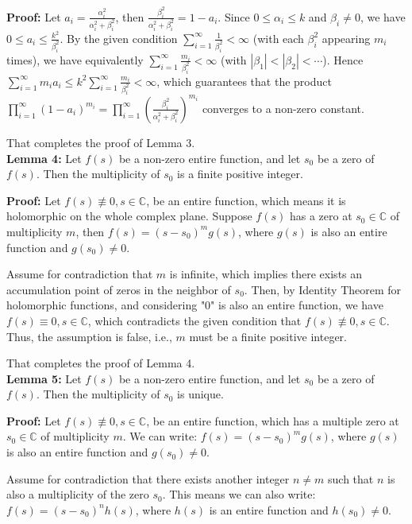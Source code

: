 \documentclass[12pt]{article}
\begin{document}
\textbf{Proof:} Let $a_i = \frac{\alpha_i^2}{\alpha_i^2+\beta_i^2}$, then
$\frac{\beta_i^2}{\alpha_i^2+\beta_i^2} = 1-a_i$.  Since \( 0 \leq \alpha_i \leq k \) and \( \beta_i \neq 0 \), we have $0 \leq a_i \leq \frac{k^2}{\beta_i^2}$.
By the given condition $\sum_{i=1}^{\infty}\frac{1}{\beta_i^2}<\infty$ (with each
$\beta_i^2$ appearing $m_i$ times), we have equivalently
$\sum_{i=1}^{\infty}\frac{m_i}{\beta_i^2}<\infty$ (with $|\beta_1|<|\beta_2|<\cdots$).
Hence $\sum_{i=1}^{\infty}m_i a_i \leq k^2\sum_{i=1}^{\infty}\frac{m_i}{\beta_i^2}< \infty$, which guarantees that the product
$\prod_{i=1}^{\infty}(1-a_i)^{m_i} = \prod_{i=1}^{\infty}\left(\frac{\beta_i^2}{\alpha_i^2+\beta_i^2}\right)^{m_i}$
converges to a non-zero constant.

That completes the proof of Lemma 3.\\

\textbf{Lemma 4:} Let $f(s)$ be a non-zero entire function, and let $s_0$ be a zero of $f(s)$. Then the multiplicity of $s_0$ is a finite positive integer.

\textbf{Proof:} Let $f(s) \not\equiv 0,  s \in \mathbb{C}$,  be an entire function, which means it is holomorphic  on the whole complex plane. Suppose $f(s)$ has a zero at $s_0 \in \mathbb{C}$ of multiplicity $m$, then $ f(s) = (s - s_0)^m g(s) $, where $g(s)$ is also an entire function and $g(s_0) \neq 0$.

Assume for contradiction that $m$ is infinite, which implies there exists an accumulation point of zeros in the neighbor of $s_0$.  Then, by Identity Theorem for holomorphic functions, and considering "0" is also an entire function, we have $f(s) \equiv 0, s \in \mathbb{C}$, which contradicts the given condition that $f(s)\not\equiv 0, s \in \mathbb{C}$.
Thus, the assumption is false, i.e., $m$ must be a finite positive integer.

That completes the proof of Lemma 4.\\


\textbf{Lemma 5:} Let $f(s)$ be a non-zero entire function, and let $s_0$ be a zero of $f(s)$. Then the multiplicity of $s_0$ is unique.

\textbf{Proof:} Let $f(s)\not\equiv 0, s\in \mathbb{C}$, be an entire function, which has a multiple zero at $s_0\in \mathbb{C}$ of multiplicity $m$.
We can write: $ f(s) = (s - s_0)^m g(s) $, where $ g(s) $ is also an entire function and $ g(s_0) \neq 0 $.

Assume for contradiction that there exists another integer $ n \neq m $ such that $ n $ is also a multiplicity of the zero $s_0$. This means we can also write: $ f(s) = (s - s_0)^n h(s) $, where $ h(s) $ is an entire function and $ h(s_0) \neq 0 $.
\end{document}
